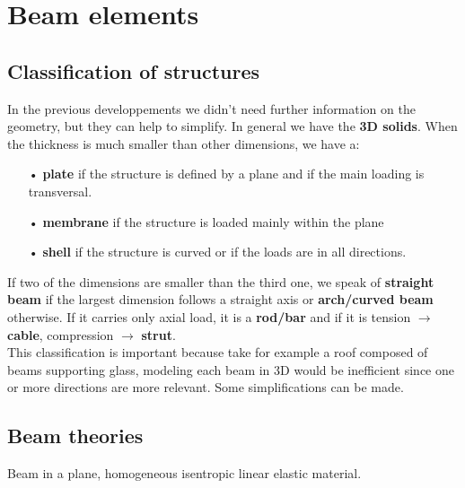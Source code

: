 
\chapter{Beam elements}
\section{Classification of structures}
	In the previous developpements we didn't need further information on the geometry, but they can help to simplify. In general we have the \textbf{3D solids}. When the thickness is much smaller than other dimensions, we have a: \\
	
	\begin{itemize}
	\item[•] \textbf{plate} if the structure is defined by a plane and if the main loading is transversal. 
	\item[•] \textbf{membrane} if the structure is loaded mainly within the plane
	\item[•] \textbf{shell} if the structure is curved or if the loads are in all directions.\\
	\end{itemize}
	
	If two of the dimensions are smaller than the third one, we speak of \textbf{straight beam} if the largest dimension follows a straight axis or \textbf{arch/curved beam} otherwise. If it carries only axial load, it is a \textbf{rod/bar} and if it is tension $\rightarrow$ \textbf{cable}, compression $\rightarrow$ \textbf{strut}.\\
	
	This classification is important because take for example a roof composed of beams supporting glass, modeling each beam in 3D would be inefficient since one or more directions are more relevant. Some simplifications can be made. 
	
\section{Beam theories}
	Beam in a plane, homogeneous isentropic linear elastic material. 
	
	\begin{center}
	\end{center}
	
